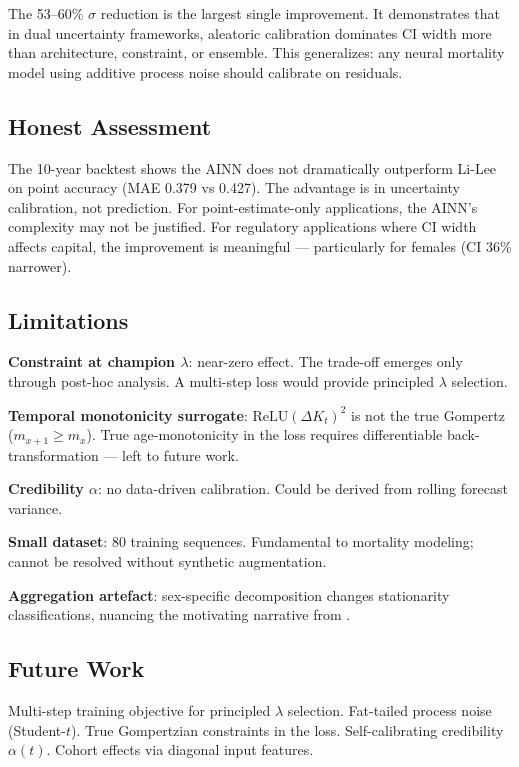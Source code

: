 \documentclass[11pt,a4paper]{article}
\begin{document}
The 53--60\% $\sigma$ reduction is the largest single improvement. It demonstrates that in dual uncertainty frameworks, aleatoric calibration dominates CI width more than architecture, constraint, or ensemble. This generalizes: any neural mortality model using additive process noise should calibrate on residuals.

\subsection{Honest Assessment}

The 10-year backtest shows the AINN does not dramatically outperform Li-Lee on point accuracy (MAE 0.379 vs 0.427). The advantage is in uncertainty calibration, not prediction. For point-estimate-only applications, the AINN's complexity may not be justified. For regulatory applications where CI width affects capital, the improvement is meaningful --- particularly for females (CI 36\% narrower).

\subsection{Limitations}

\textbf{Constraint at champion $\lambda$}: near-zero effect. The trade-off emerges only through post-hoc analysis. A multi-step loss would provide principled $\lambda$ selection.

\textbf{Temporal monotonicity surrogate}: $\text{ReLU}(\Delta K_t)^2$ is not the true Gompertz ($m_{x+1} \geq m_x$). True age-monotonicity in the loss requires differentiable back-transformation --- left to future work.

\textbf{Credibility $\alpha$}: no data-driven calibration. Could be derived from rolling forecast variance.

\textbf{Small dataset}: 80 training sequences. Fundamental to mortality modeling; cannot be resolved without synthetic augmentation.

\textbf{Aggregation artefact}: sex-specific decomposition changes stationarity classifications, nuancing the motivating narrative from \cite{rindori2026p04}.

\subsection{Future Work}

Multi-step training objective for principled $\lambda$ selection. Fat-tailed process noise (Student-$t$). True Gompertzian constraints in the loss. Self-calibrating credibility $\alpha(t)$. Cohort effects via diagonal input features.
\end{document}
